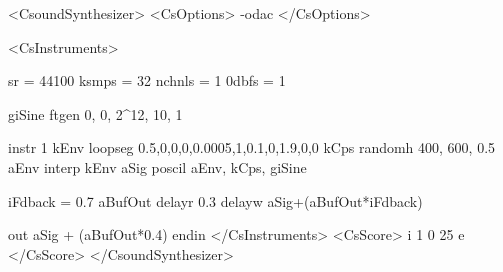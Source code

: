 <CsoundSynthesizer>
<CsOptions>
-odac 
</CsOptions>

<CsInstruments>

sr = 44100
ksmps = 32
nchnls = 1
0dbfs = 1

giSine   ftgen   0, 0, 2^12, 10, 1 

  instr 1
kEnv    loopseg  0.5,0,0,0,0.0005,1,0.1,0,1.9,0,0
kCps    randomh  400, 600, 0.5                    
aEnv    interp   kEnv                            
aSig    poscil   aEnv, kCps, giSine               

iFdback =        0.7                    
aBufOut delayr   0.3                    
        delayw   aSig+(aBufOut*iFdback)

        out      aSig + (aBufOut*0.4)
  endin
</CsInstruments>
<CsScore>
i 1 0 25
e
</CsScore>
</CsoundSynthesizer>
